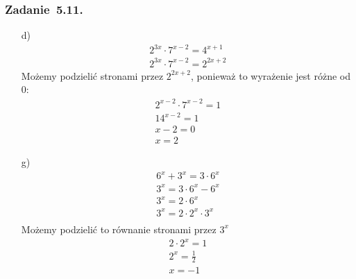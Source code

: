 \subsubsection*{Zadanie~5.11.}
\begin{itemize}
    \item[d)]
        \begin{gather*}
            2^{3x} \cdot 7^{x - 2} = 4^{x + 1}\\
            2^{3x} \cdot 7^{x - 2} = 2^{2x + 2}
        \end{gather*}
        Możemy podzielić stronami przez \(2^{2x + 2}\), ponieważ to wyrażenie jest różne od \(0\):
        \begin{gather*}
            2^{x - 2} \cdot 7^{x - 2} = 1\\
            14^{x - 2} = 1\\
            x - 2 = 0\\
            x = 2
        \end{gather*}
    \item[g)]
        \begin{gather*}
            6^x + 3^x = 3 \cdot 6^x\\
            3^x = 3 \cdot 6^x - 6^x\\
            3^x = 2 \cdot 6^x\\
            3^x = 2 \cdot 2^x \cdot 3^x\\
        \end{gather*}
        Możemy podzielić to równanie stronami przez \(3^x\)
        \begin{gather*}
            2 \cdot 2^x = 1\\
            2^x = \frac{1}{2}\\
            x = -1
        \end{gather*}
\end{itemize}
